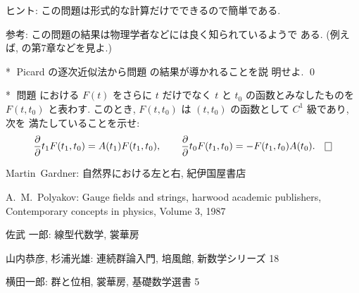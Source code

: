 \documentclass[12pt,twoside]{jarticle}
\def\qstar#1{$\!\!\!$#1$\;$}
\begin{document}
\noindent ヒント: この問題は形式的な計算だけでできるので簡単である.

\noindent 参考: この問題の結果は物理学者などには良く知られているようで
ある. (例えば, \cite{Polyakov}{} の第7章などを見よ.)

\begin{question}\label{q:DS3}\qstar{*}
  Picard の逐次近似法から問題  の結果が導かれることを説
  明せよ. \qed
\end{question}

\begin{question}\label{q:DS4}\qstar{*}
  問題  における $F(t)$ をさらに $t$ だけでなく $t$ と 
  $t_0$ の函数とみなしたものを $F(t,t_0)$ と表わす. %
  このとき, $F(t, t_0)$ は $(t,t_0)$ の函数として $C^1$ 級であり, 次を
  満たしていることを示せ:
  \[
    \pd{}{t_1} F(t_1,t_0) = A(t_1) F(t_1,t_0),
    \qquad
    \pd{}{t_0} F(t_1,t_0) = - F(t_1,t_0) A(t_0).
  \qed
  \]
\end{question}


\begin{thebibliography}{ABC}

Martin~Gardner: 自然界における左と右, 紀伊国屋書店


A.~M.~Polyakov: Gauge fields and strings, harwood academic publishers,
Contemporary concepts in physics, Volume 3, 1987

佐武 一郎: 線型代数学, 裳華房


山内恭彦, 杉浦光雄: 連続群論入門, 培風館, 新数学シリーズ 18

横田一郎: 群と位相, 裳華房, 基礎数学選書 5

\end{thebibliography}

\end{document}
